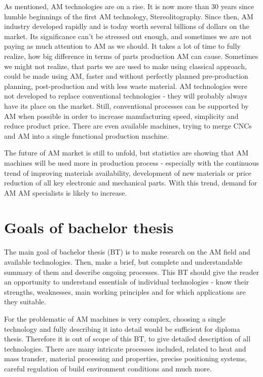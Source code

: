 \documentclass[a4paper, twoside, 11pt]{report}
\begin{document}
	As mentioned, AM technologies are on a rise. It is now more than 30 years since humble beginnings of the first AM technology, Stereolitography. Since then, AM industry developed rapidly and is today worth several billions of dollars on the market. Its significance can't be stressed out enough, and sometimes we are not paying as much attention to AM as we should. It takes a lot of time to fully realize, how big difference in terms of parts production AM can cause. Sometimes we might not realize, that parts we are used to make using classical approach, could be made using AM, faster and without perfectly planned pre-production planning, post-production and with less waste material. AM technologies were not developed to replace conventional technologies - they will probably always have its place on the market. Still, conventional processes can be supported by AM when possible in order to increase manufacturing speed, simplicity and reduce product price. There are even available machines, trying to merge CNCs and AM into a single functional production machine.
	
	The future of AM market is still to unfold, but statistics are showing that AM machines will be used more in production process - especially with the continuous trend of improving materials availability, development of new materials or price reduction of all key electronic and mechanical parts. With this trend, demand for AM AM specialists is likely to increase.
	
\section{Goals of bachelor thesis}	
	The main goal of bachelor thesis (BT) is to make research on the AM field and available technologies. Then, make a brief, but complete and understandable summary of them and describe ongoing processes. This BT should give the reader an opportunity to understand essentials of individual technologies - know their strengths, weaknesses, main working principles and for which applications are they suitable.
	
	For the problematic of AM machines is very complex, choosing a single technology and fully describing it into detail would be sufficient for diploma thesis. Therefore it is out of scope of this BT, to give detailed description of all technologies. There are many intricate processes included, related to heat and mass transfer, material processing and properties, precise positioning systems, careful regulation of build environment conditions and much more.
	\newpage
%
\end{document}
